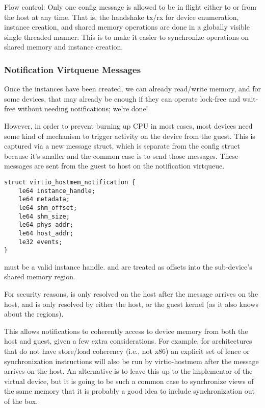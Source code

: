 Flow control: Only one config message is allowed to be in flight
either to or from the host at any time.
That is, the handshake tx/rx for device enumeration, instance creation, and shared memory operations
are done in a globally visible single threaded manner.
This is to make it easier to synchronize operations on shared memory and instance creation.

\subsubsection{Notification Virtqueue Messages}\label{sec:Device Types / Host Memory Device / Device Operation / Notification Virtqueue Messages}

Once the instances have been created,
we can already read/write memory, and for some devices, that may already be enough
if they can operate lock-free and wait-free without needing notifications; we're done!

However, in order to prevent burning up CPU in most cases,
most devices need some kind of mechanism to trigger activity on the device
from the guest. This is captured via a new message struct,
which is separate from the config struct because it's smaller and
the common case is to send those messages.
These messages are sent from the guest to host
on the notification virtqueue.

\begin{lstlisting}
struct virtio_hostmem_notification {
    le64 instance_handle;
    le64 metadata;
    le64 shm_offset;
    le64 shm_size;
    le64 phys_addr;
    le64 host_addr;
    le32 events;
}
\end{lstlisting}

 must be a valid instance handle.
 and 
are treated as offsets into the sub-device's shared memory region.

For security reasons,
 is only resolved on the host after the message arrives on the host,
and  is only resolved by either the host, or the guest kernel
(as it also knows about the regions).

This allows notifications to coherently access to device memory
from both the host and guest, given a few extra considerations.
For example, for architectures that do not have store/load coherency (i.e., not x86)
an explicit set of fence or synchronization instructions will also be run by virtio-hostmem
after the message arrives on the host.
An alternative is to leave this up to the implementor of the virtual device,
but it is going to be such a common case to synchronize views of the same memory
that it is probably a good idea to include synchronization out of the box.


